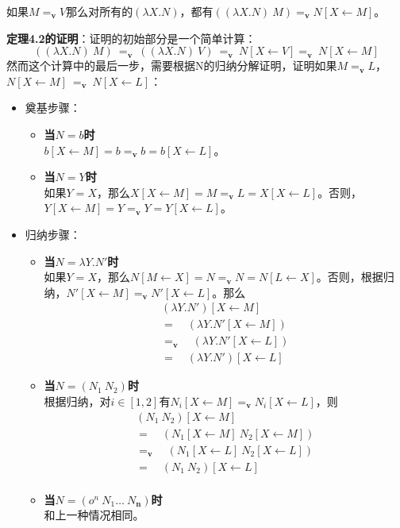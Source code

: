 \documentclass{book}
\begin{document}
\begin{Theorem}
 如果$M=_{\mathbf{v}}V$那么对所有的$(\lambda X.N)$，都有$((\lambda X.N)\ M)=_{\mathbf{v}} N[X\leftarrow M]$。
\end{Theorem}
\begin{adjustwidth}{20pt}{20pt}
 \textbf{定理4.2的证明}：证明的初始部分是一个简单计算：
 $$
 ((\lambda X.N)\ M)\ =_{\mathbf{v}}\ ((\lambda X.N)\ V)\ =_{\mathbf{v}}\ N[X\leftarrow V]=_{\mathbf{v}}\ N[X\leftarrow M] 
 $$
 然而这个计算中的最后一步，需要根据N的归纳分解证明，证明如果$M=_{\mathbf{v}} L$，$N[X\leftarrow M]\ =_{\mathbf{v}}\ N[X\leftarrow L]$：
 \begin{itemize}
  \item 奠基步骤：
  \begin{itemize}
   \item \textbf{当$N=b$时}\\
   $b[X\leftarrow M]=b=_{\mathbf{v}}b=b[X\leftarrow L]$。
   \item \textbf{当$N=Y$时}\\
   如果$Y=X$，那么$X[X\leftarrow M]=M=_{\mathbf{v}}L=X[X\leftarrow L]$。否则，$Y[X\leftarrow M]=Y=_{\mathbf{v}}Y=Y[X\leftarrow L]$。
  \end{itemize}
  \item 归纳步骤：
  \begin{itemize}
   \item \textbf{当$N=\lambda Y.N'$时}\\
   如果$Y=X$，那么$N[M\leftarrow X]=N=_{\mathbf{v}}N=N[L\leftarrow X]$。否则，根据归纳，$N'[X\leftarrow M]=_{\mathbf{v}} N'[X\leftarrow L]$。那么
   $$
   \begin{array}{l}
    (\lambda Y.N')[X\leftarrow M]\\
    =\quad(\lambda Y.N'[X\leftarrow M])\\
    =_{\mathbf{v}}\quad(\lambda Y.N'[X\leftarrow L])\\
    =\quad(\lambda Y.N')[X\leftarrow L]
   \end{array}
   $$
   \item \textbf{当$N=(N_1\ N_2)$时}\\
   根据归纳，对$i\in[1,2]$有$N_i[X\leftarrow M]=_{\mathbf{v}}N_i[X\leftarrow L]$，则
   $$
   \begin{array}{l}
   (N_1\ N_2)[X\leftarrow M]\\
   =\quad (N_1[X\leftarrow M]\ N_2[X\leftarrow M])\\
   =_{\mathbf{v}}\quad (N_1[X\leftarrow L]\ N_2[X\leftarrow L])\\
   =\quad (N_1\ N_2)[X\leftarrow L]\\
   \end{array}
   $$
   \item \textbf{当$N=(o^n\ N_1\ldots\ N_\textbf{n})$时}\\
   和上一种情况相同。
  \end{itemize}
 \end{itemize}
\end{adjustwidth}
\end{document}
